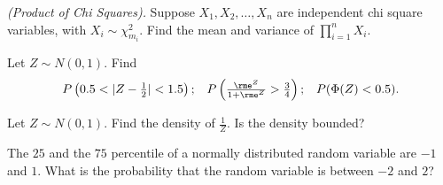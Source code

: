\begin{problem}[Handout 13, \# 19]
  \emph{(Product of Chi Squares).} Suppose \(X_1,X_2,\dotsc,X_n\) are
  independent chi square variables, with \(X_i\sim\chi_{m_i}^2\). Find the
  mean and variance of \(\prod_{i=1}^n X_i\).
\end{problem}
\begin{solution}

\end{solution}
\newpage

\begin{problem}[Handout 13, \# 20]
  Let \(Z\sim N(0,1)\). Find
  \[
    \begin{aligned}
      P\left( 0.5<|Z-\tfrac{1}{2}|<1.5\right);
      && P\left(\tfrac{\rme^Z}{1+\rme^Z}>\tfrac{3}{4}\right);
      &&P(\Phi(Z)<0.5).
    \end{aligned}
  \]
\end{problem}
\begin{solution}

\end{solution}
\newpage

\begin{problem}[Handout 13, \# 21]
  Let \(Z\sim N(0,1)\). Find the density of \(\frac{1}{Z}\). Is the density
  bounded?
\end{problem}
\begin{solution}

\end{solution}
\newpage

\begin{problem}[Handout 13, \# 22]
  The \(25\) and the \(75\) percentile of a
  normally distributed random variable are \(-1\) and \(1\). What is the
  probability that the random variable is between \(-2\) and \(2\)?
\end{problem}
\begin{solution}

\end{solution}

